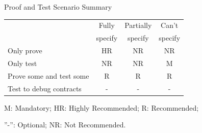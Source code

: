 \documentclass{beamer}
\begin{document}
\begin{frame}[fragile]{Proof and Test Scenario Summary}
\begin{center}
\begin{tabular}{p{4.3cm} | c | c | c }
    & Fully & Partially & Can't \\
    & specify & specify & specify \\
  \hline
  Only prove & HR & NR & NR \\
  \hline
  Only test &  NR &  NR & M \\
  \hline
  \raggedright Prove some and test some & R & R & R \\
  \hline
  Test to debug contracts & - & - & - \\
\end{tabular}

\vspace{1cm}
M: Mandatory; HR: Highly Recommended; R: Recommended; 

''-'': Optional; NR: Not Recommended.

\end{center}

\end{frame}
\end{document}
